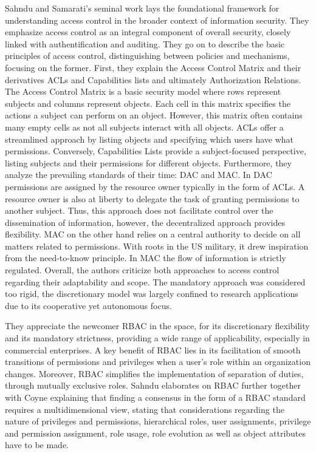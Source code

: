 Sahndu and Samarati's seminal work \cite{Sandhu1994} lays the foundational framework for understanding access control in the broader context of information security. They emphasize access control as an integral component of overall security, closely linked with authentification and auditing. They go on to describe the basic principles of access control, distinguishing between policies and mechanisms, focusing on the former. First, they explain the Access Control Matrix and their derivatives \acp{ACL} and Capabilities lists and ultimately Authorization Relations. The Access Control Matrix is a basic security model where rows represent subjects and columns represent objects. Each cell in this matrix specifies the actions a subject can perform on an object. However, this matrix often contains many empty cells as not all subjects interact with all objects. \acp{ACL} offer a streamlined approach by listing objects and specifying which users have what permissions. Conversely, Capabilities Lists provide a subject-focused perspective, listing subjects and their permissions for different objects. Furthermore, they analyze the prevailing standards of their time: \ac{DAC} and \ac{MAC}. In \ac{DAC} permissions are assigned by the resource owner typically in the form of \acp{ACL}. A resource owner is also at liberty to delegate the task of granting permissions to another subject. Thus, this approach does not facilitate control over the dissemination of information, however, the decentralized approach provides flexibility. \ac{MAC} on the other hand relies on a central authority to decide on all matters related to permissions. With roots in the US military, it drew inspiration from the need-to-know principle. In \ac{MAC} the flow of information is strictly regulated. Overall, the authors criticize both approaches to access control regarding their adaptability and scope. The mandatory approach was considered too rigid, the discretionary model was largely confined to research applications due to its cooperative yet autonomous focus.\par 
They appreciate the newcomer \ac{RBAC} in the space, for its discretionary flexibility and its mandatory strictness, providing a wide range of applicability, especially in commercial enterprises. A key benefit of \ac{RBAC} lies in its facilitation of smooth transitions of permissions and privileges when a user's role within an organization changes. Moreover, \ac{RBAC} simplifies the implementation of separation of duties, through mutually exclusive roles. Sahndu elaborates on \ac{RBAC} further together with Coyne \cite{Sandhu_Coyne_1994} explaining that finding a consensus in the form of a \ac{RBAC} standard requires a multidimensional view, stating that considerations regarding the nature of privileges and permissions, hierarchical roles, user assignments, privilege and permission assignment, role usage, role evolution as well as object attributes have to be made. \par
